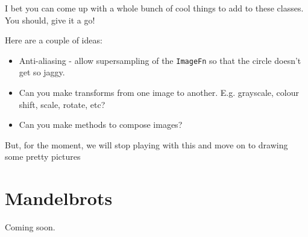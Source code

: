 \documentclass{article}
\begin{document}
            I bet you can come up with a whole bunch of cool things to add to these classes.  You should, give it a go!
            
            Here are a couple of ideas:
            \begin{itemize}
                \item Anti-aliasing - allow supersampling of the \texttt{ImageFn} so that the circle doesn't get so jaggy.
                \item Can you make transforms from one image to another.  E.g. grayscale, colour shift, scale, rotate, etc?
                \item Can you make methods to compose images?
            \end{itemize}
            
            But, for the moment, we will stop playing with this and move on to drawing some pretty pictures 

    \newpage
    \section{Mandelbrots}

        Coming soon.
        
\end{document}
